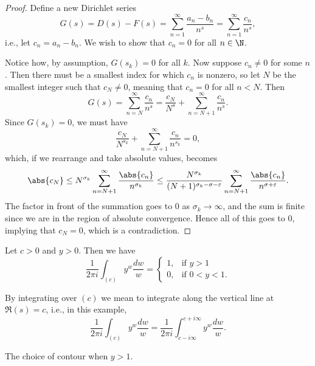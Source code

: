 \begin{proof}
	Define a new Dirichlet series
	\[
		G(s) = D(s) - F(s) = \sum_{n = 1}^\infty \frac{a_n - b_n}{n^s} = \sum_{n = 1}^\infty \frac{c_n}{n^s},
	\]
	i.e., let $c_n = a_n - b_n$.
	We wish to show that $c_n = 0$ for all $n \in \N$.

	Notice how, by assumption, $G(s_k) = 0$ for all $k$.
	Now suppose $c_n \neq 0$ for some $n$.
	Then there must be a smallest index for which $c_n$ is nonzero, so let $N$ be the smallest integer such that $c_N \neq 0$, meaning that $c_n = 0$ for all $n < N$.
	Then
	\[
		G(s) = \sum_{n = N}^\infty \frac{c_n}{n^s} = \frac{c_N}{N^s} + \sum_{n = N + 1}^\infty \frac{c_n}{n^s}.
	\]
	Since $G(s_k) = 0$, we must have
	\[
		\frac{c_N}{N^{s_k}} + \sum_{n = N + 1}^\infty \frac{c_n}{n^{s_k}} = 0,
	\]
	which, if we rearrange and take absolute values, becomes
	\[
		\abs{c_N} \leq N^{\sigma_k} \sum_{n = N + 1}^\infty \frac{\abs{c_n}}{n^{\sigma_k}} \leq \frac{N^{\sigma_k}}{(N + 1)^{\sigma_k - \sigma - \varepsilon}} \sum_{n = N + 1}^\infty \frac{\abs{c_n}}{n^{\sigma + \varepsilon}}.
	\]
	The factor in front of the summation goes to $0$ as $\sigma_k \to \infty$, and the sum is finite since we are in the region of absolute convergence.
	Hence all of this goes to $0$, implying that $c_N = 0$, which is a contradiction.
\end{proof}


\begin{lemma}\label{lem12.5}
	Let $c > 0$ and $y > 0$.
	Then we have
	\[
		\frac{1}{2 \pi i} \int_{(c)} y^w \frac{d w}{w} = \begin{cases}
			1, & \text{if $y > 1$} \\
			0, & \text{if $0 < y < 1$}.
		\end{cases}
	\]
\end{lemma}

\begin{remark}
	By integrating over $(c)$ we mean to integrate along the vertical line at $\Re(s) = c$, i.e., in this example,
	\[
		\frac{1}{2 \pi i} \int_{(c)} y^w \frac{d w}{w} = \frac{1}{2 \pi i} \int_{c - i \infty}^{c + i \infty} y^w \frac{d w}{w}.
	\]
\end{remark}

\begin{marginfigure}

	\caption{\label{l30:lem125a} The choice of contour when $y > 1$.}
\end{marginfigure}

